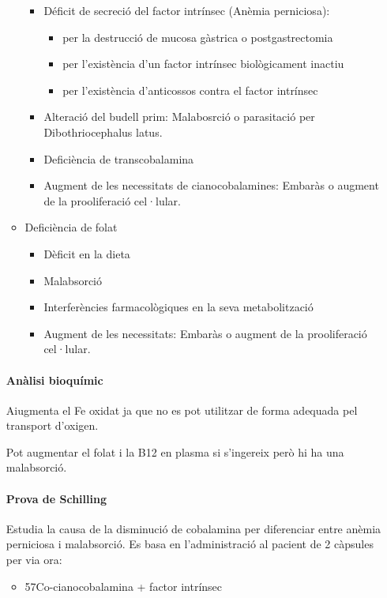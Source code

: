 \begin{itemize}
\begin{itemize}
\begin{itemize}
  \item Déficit de secreció del factor intrínsec (Anèmia perniciosa):
    \begin{itemize}
    \item per la destrucció de mucosa gàstrica o postgastrectomia
      
    \item per l’existència d’un factor intrínsec biològicament inactiu
      
    \item per l’existència d’anticossos contra el factor intrínsec
    \end{itemize}
    
  \item Alteració del budell prim: Malabosrció o parasitació per Dibothriocephalus latus.

  \item Deficiència de transcobalamina
  \item Augment de les necessitats de cianocobalamines: Embaràs o augment de la prooliferació cel·lular.
  \end{itemize}
\item Deficiència de folat
  \begin{itemize}
  \item Dèficit en la dieta
    
  \item Malabsorció
    
  \item Interferències farmacològiques en la seva metabolització
  \item Augment de les necessitats: Embaràs o augment de la prooliferació cel·lular.
  \end{itemize}
\end{itemize}

\paragraph{Anàlisi bioquímic}
Aiugmenta el Fe oxidat ja que no es pot utilitzar de forma adequada pel transport d'oxigen.

Pot augmentar el folat i la B12 en plasma si s'ingereix però hi ha una malabsorció.

\paragraph{Prova de Schilling}
Estudia la causa de la disminució de cobalamina per diferenciar entre anèmia perniciosa i malabsorció. Es basa en l'administració al pacient de 2 càpsules per via ora:
\begin{itemize}
\item 57Co-cianocobalamina + factor intrínsec
  

\end{itemize}
\end{itemize}
